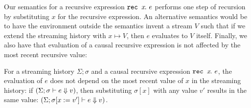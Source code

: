Our semantics for a recursive expression $\texttt{rec~} x\hspace{-0.1em}.~e$ performs one step of recursion by substituting $x$ for the recursive expression.
An alternative semantics would be to have the environment outside the semantics invent a stream $V$ such that if we extend the streaming history with $x \mapsto V$, then $e$ evaluates to $V$ itself.
Finally, we also have that evaluation of a causal recursive expression is not affected by the most recent recursive value:
\begin{theorem}
  For a streaming history $\Sigma; \sigma$ and a causal recursive expression $\texttt{rec~} x\hspace{-0.1em}.~e$, the evaluation of $e$ does not depend on the most recent value of $x$ in the streaming history: if $(\Sigma; \sigma \vdash e \Downarrow v)$, then substituting $\sigma[x]$ with any value $v'$ results in the same value: $(\Sigma; \sigma[x := v'] \vdash e \Downarrow v)$.
\end{theorem}

